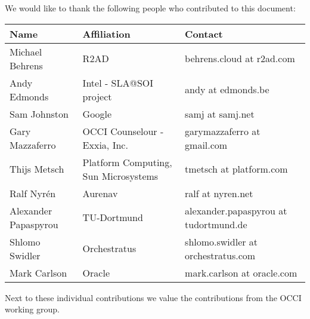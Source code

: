 
We would like to thank the following people who contributed to this
document:

\begin{tabular}{l|p{2in}|p{2in}}
Name & Affiliation & Contact \\
\hline
Michael Behrens & R2AD & behrens.cloud at r2ad.com \\
Andy Edmonds & Intel - SLA@SOI project & andy at edmonds.be \\
Sam Johnston & Google & samj at samj.net \\
Gary Mazzaferro & OCCI Counselour - Exxia, Inc. &  garymazzaferro at gmail.com \\ 
Thijs Metsch & Platform Computing, Sun Microsystems & tmetsch at platform.com \\
Ralf Nyrén & Aurenav & ralf at nyren.net \\
Alexander Papaspyrou & TU-Dortmund & alexander.papaspyrou at tu\-dortmund.de \\
Shlomo Swidler & Orchestratus & shlomo.swidler at orchestratus.com \\
Mark Carlson & Oracle & mark.carlson at oracle.com \\
\end{tabular}

Next to these individual contributions we value the contributions from
the OCCI working group.
